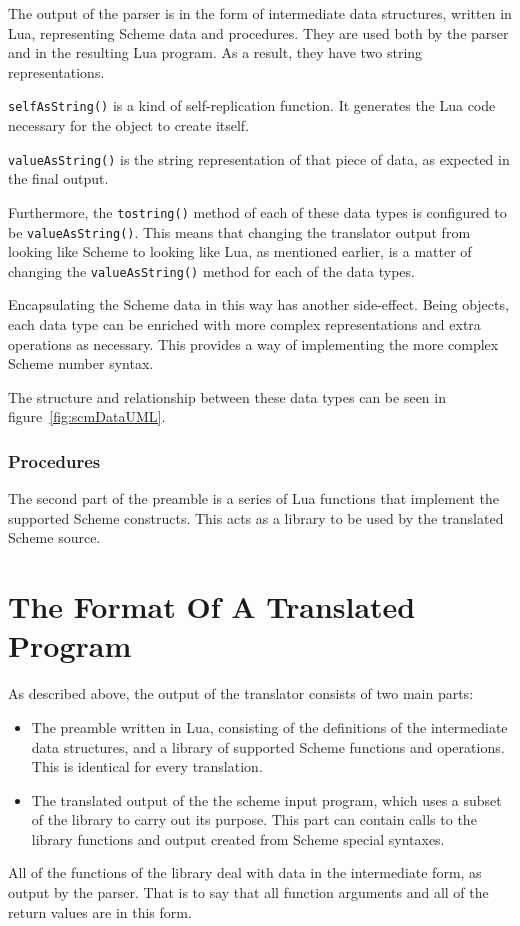 The output of the parser is in the form of intermediate data structures, written
in Lua, representing Scheme data and procedures. They are used both by the
parser and in the resulting Lua program. As a result, they have two
string representations.
\begin{description}
\item \texttt{selfAsString()} is a kind of self-replication function. It
generates the Lua code necessary for the object to create itself.
\item \texttt{valueAsString()} is the string representation of that piece of
data, as expected in the final output.
\end{description}
Furthermore, the \texttt{tostring()} method of each of these data types is
configured to be \texttt{valueAsString()}. This means that changing the
translator output from looking like Scheme to looking like Lua, as mentioned
earlier, is a matter of changing the \texttt{valueAsString()} method for each of
the data types.

Encapsulating the Scheme data in this way has another side-effect. Being
objects, each data type can be enriched with more complex representations and
extra operations as necessary. This provides a way of implementing the more
complex Scheme number syntax.

The structure and relationship between these data types
can be seen in figure~\ref{fig:scmDataUML}.

\subsubsection{Procedures}

The second part of the preamble is a series of Lua functions that implement the
supported Scheme constructs. This acts as a library to be used by the
translated Scheme source.


\section{The Format Of A Translated Program}

As described above, the output of the translator consists of two main parts:
\begin{itemize}
\item The preamble written in Lua, consisting of the definitions of the
intermediate data structures, and a library of supported Scheme functions and
operations.  This is identical for every translation.
\item The translated output of the the scheme input program, which uses a subset
of the library to carry out its purpose. This part can contain calls to the
library functions and output created from Scheme special syntaxes.
\end{itemize}

All of the functions of the library deal with data in the intermediate form, as
output by the parser. That is to say that all function arguments and all of the
return values are in this form.
